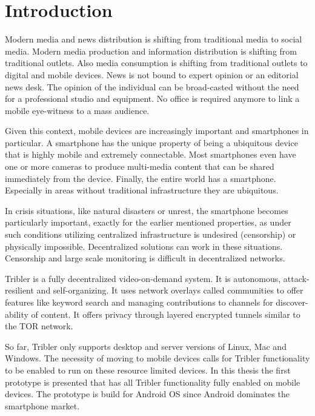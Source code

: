 \chapter{Introduction}\label{ch:intro}

Modern media and news distribution is shifting from traditional media to social media.
Modern media production and information distribution is shifting from traditional outlets.
Also media consumption is shifting from traditional outlets to digital and mobile devices.
News is not bound to expert opinion or an editorial news desk.
The opinion of the individual can be broad-casted without the need for a professional studio and equipment.
No office is required anymore to link a mobile eye-witness to a mass audience.
\cite{news_crowd}

Given this context, mobile devices are increasingly important and smartphones in particular.
A smartphone has the unique property of being a ubiquitous device that is highly mobile and extremely connectable.
Most smartphones even have one or more cameras to produce multi-media content that can be shared immediately from the device.
Finally, the entire world has a smartphone.
Especially in areas without traditional infrastructure they are ubiquitous.

In crisis situations, like natural disasters or unrest, the smartphone becomes particularly important, exactly for the earlier mentioned properties, as under such conditions utilizing centralized infrastructure is undesired (censorship) or physically impossible.
Decentralized solutions can work in these situations.
Censorship and large scale monitoring is difficult in decentralized networks.
\cite{pouwelse2012censorshipfree}


Tribler is a fully decentralized video-on-demand system. \cite{TriblerOverviewJournal, tribler2014play, tribler-anon-hd}
It is autonomous, attack-resilient and self-organizing. \cite{votecast, tribler-gossip}
It uses network overlays called communities to offer features like keyword search and managing contributions to channels for discover-ability of content.
It offers privacy through layered encrypted tunnels similar to the TOR network.\cite{tribler2014at3, dingledine2004tor, dingledine2006design}

So far, Tribler only supports desktop and server versions of Linux, Mac and Windows.
The necessity of moving to mobile devices calls for Tribler functionality to be enabled to run on these resource limited devices.
In this thesis the first prototype is presented that has all Tribler functionality fully enabled on mobile devices.
The prototype is build for Android OS since Android dominates the smartphone market.



